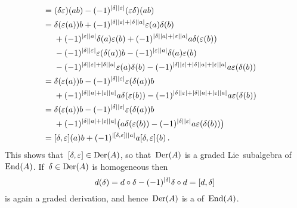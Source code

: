 \documentclass[a4paper,10pt,headings=standardclasses]{scrartcl}
\begin{document}
\begin{enumerate}
\begin{align*}
      \\
      ={}&
        (\delta \varepsilon)(ab)
      - (-1)^{\lvert\delta\rvert \lvert\varepsilon\rvert}
        (\varepsilon \delta)(ab)
      \\
      ={}&
        \delta(\varepsilon(a)) b
      + (-1)^{\lvert\delta\rvert \lvert\varepsilon\rvert + \lvert\delta\rvert \lvert a\rvert}
        \varepsilon(a) \delta(b)
      \\
      {}&
      + (-1)^{\lvert\varepsilon\rvert \lvert a\rvert}
        \delta(a) \varepsilon(b)
      + (-1)^{\lvert\delta\rvert \lvert a\rvert + \lvert\varepsilon\rvert \lvert a\rvert}
        a \delta(\varepsilon(b))
      \\
      {}&
      - (-1)^{\lvert\delta\rvert \lvert\varepsilon\rvert}
        \varepsilon(\delta(a)) b
      - (-1)^{\lvert\varepsilon\rvert \lvert a\rvert}
        \delta(a) \varepsilon(b)
      \\
      {}&
      - (-1)^{\lvert\delta\rvert \lvert\varepsilon\rvert + \lvert\delta\rvert \lvert a\rvert}
        \varepsilon(a) \delta(b)
      - (-1)^{\lvert\delta\rvert \lvert\varepsilon\rvert  + \lvert\delta\rvert \lvert a\rvert + \lvert\varepsilon\rvert \lvert a\rvert}
        a \varepsilon(\delta(b))
      \\
      ={}&
        \delta(\varepsilon(a)) b
      - (-1)^{\lvert\delta\rvert \lvert\varepsilon\rvert}
        \varepsilon(\delta(a)) b
      \\
      {}&
      + (-1)^{\lvert\delta\rvert \lvert a\rvert + \lvert\varepsilon\rvert \lvert a\rvert}
        a \delta(\varepsilon(b))
      - (-1)^{\lvert\delta\rvert \lvert\varepsilon\rvert  + \lvert\delta\rvert \lvert a\rvert + \lvert\varepsilon\rvert \lvert a\rvert}
        a \varepsilon(\delta(b))
      \\
      ={}&
        \delta(\varepsilon(a)) b
      - (-1)^{\lvert\delta\rvert \lvert\varepsilon\rvert}
        \varepsilon(\delta(a)) b
      \\
      {}&
      + (-1)^{\lvert\delta\rvert \lvert a\rvert + \lvert\varepsilon\rvert \lvert a\rvert}
        \bigl(
            a \delta(\varepsilon(b))
          - (-1)^{\lvert\delta\rvert \lvert\varepsilon\rvert}
            a \varepsilon(\delta(b))
        \bigr)
      \\
      ={}&
        [\delta, \varepsilon](a) b
      + (-1)^{\lvert[\delta, \varepsilon]\rvert \lvert a\rvert}
        a [\delta, \varepsilon](b) \,.
    \end{align*}
    \endgroup
    This shows that~$[\delta, \varepsilon] \in \operatorname{Der}(A)$, so that~$\operatorname{Der}(A)$ is a graded Lie~subalgebra of~$\operatorname{End}(A)$.
    If~$\delta \in \operatorname{Der}(A)$ is homogeneous then
    \[
      d(\delta)
      =
      d \circ \delta
      - (-1)^{\lvert\delta\rvert}
      \delta \circ d
      =
      [d, \delta]
    \]
    is again a graded derivation, and hence~$\operatorname{Der}(A)$ is a {\dgsub} of~$\operatorname{End}(A)$.
    

\end{enumerate}
\end{document}
